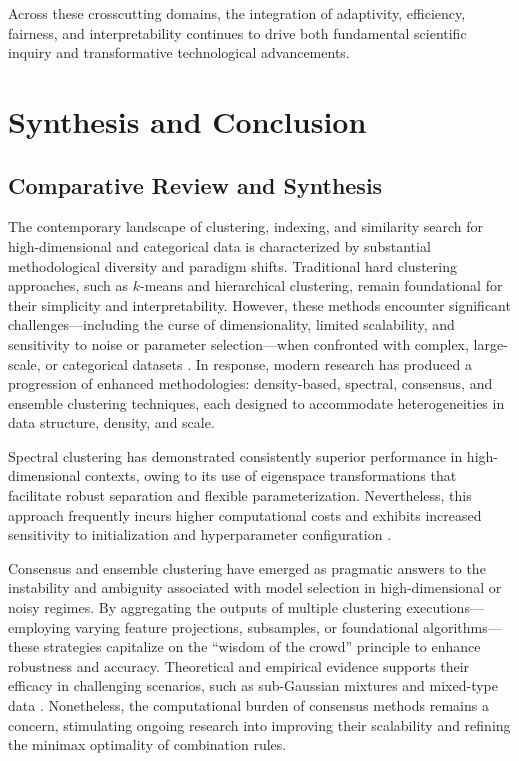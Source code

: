 Across these crosscutting domains, the integration of adaptivity, efficiency, fairness, and interpretability continues to drive both fundamental scientific inquiry and transformative technological advancements.

\section{Synthesis and Conclusion}

\subsection{Comparative Review and Synthesis}

The contemporary landscape of clustering, indexing, and similarity search for high-dimensional and categorical data is characterized by substantial methodological diversity and paradigm shifts. Traditional hard clustering approaches, such as $k$-means and hierarchical clustering, remain foundational for their simplicity and interpretability. However, these methods encounter significant challenges—including the curse of dimensionality, limited scalability, and sensitivity to noise or parameter selection—when confronted with complex, large-scale, or categorical datasets \cite{ref20,ref29,ref80}. In response, modern research has produced a progression of enhanced methodologies: density-based, spectral, consensus, and ensemble clustering techniques, each designed to accommodate heterogeneities in data structure, density, and scale.

Spectral clustering has demonstrated consistently superior performance in high-dimensional contexts, owing to its use of eigenspace transformations that facilitate robust separation and flexible parameterization. Nevertheless, this approach frequently incurs higher computational costs and exhibits increased sensitivity to initialization and hyperparameter configuration \cite{ref81,ref14,ref19}.

Consensus and ensemble clustering have emerged as pragmatic answers to the instability and ambiguity associated with model selection in high-dimensional or noisy regimes. By aggregating the outputs of multiple clustering executions—employing varying feature projections, subsamples, or foundational algorithms—these strategies capitalize on the ``wisdom of the crowd'' principle to enhance robustness and accuracy. Theoretical and empirical evidence supports their efficacy in challenging scenarios, such as sub-Gaussian mixtures and mixed-type data \cite{ref20,ref39,ref30,ref76,ref111}. Nonetheless, the computational burden of consensus methods remains a concern, stimulating ongoing research into improving their scalability and refining the minimax optimality of combination rules.

